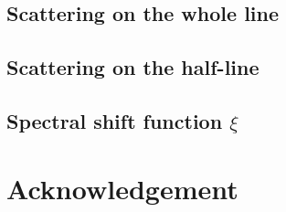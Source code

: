 \documentclass[10pt,a4paper,abstracton,toc=bibliography,DIV=12]{scrartcl} %
\numberwithin{equation}{section}
\begin{document}
\subsection{Scattering on the whole line\label{stl}}

\subsection{Scattering on the half-line\label{sthl}}

\subsection{Spectral shift function \texorpdfstring{$\xi$}{}\label{ssf}}

%
%
\section*{Acknowledgement}

%
%
%

%

%
\end{document}

